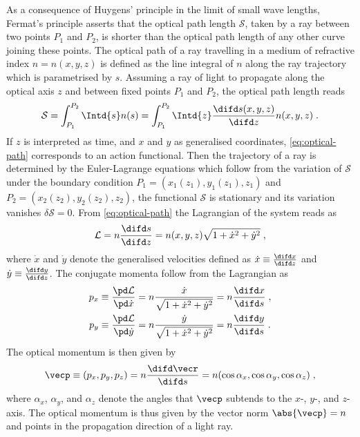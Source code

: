 \documentclass[
twoside,
openright,
titlepage,
numbers=noenddot,
headinclude,
fleqn,
a4paper,
footinclude=true,
cleardoublepage=empty,
abstractoff,
BCOR=5mm,
paper=a4,
fontsize=11pt,
british,ngerman,american,
]{scrreprt}
\begin{document}
As a consequence of Huygens' principle in the limit
of small wave lengths, Fermat's principle asserts that the optical
path length $\mathcal{S}$, taken by a ray between two points $P_1$ and
$P_2$, is shorter than the optical path length of any other curve
joining these points.  The optical path of a ray travelling in a
medium of refractive index $n=n(x,y,z)$ is defined as the line
integral of $n$ along the ray trajectory which is parametrised by $s$.
Assuming a ray of light to propagate along the optical axis $z$ and
between fixed points $P_1$ and $P_2$, the optical path length reads 
\begin{equation}
  \label{eq:optical-path}
  \mathcal{S} = \int_{P_1}^{P_2}\Intd{s}n(s) 
  = \int_{P_1}^{P_2}\Intd{z}\frac{\difd s(x,y,z)}{\difd z}n(x,y,z)\;.
\end{equation}
If $z$ is interpreted as time, and $x$ and $y$ as generalised
coordinates, \cref{eq:optical-path} corresponds to an action
functional.  Then the trajectory of a ray is determined by the
Euler-Lagrange equations which follow from the variation of
$\mathcal{S}$ under the boundary condition
$P_1=(x_1(z_1),y_1(z_1),z_1)$ and $P_2=(x_2(z_2),y_2(z_2),z_2)$, \ie{}
the functional $\mathcal{S}$ is stationary and its variation vanishes
$\delta\mathcal{S} = 0$.  From \cref{eq:optical-path} the Lagrangian
of the system reads as
\begin{equation}
  \label{eq:optical-path-lagrangian}
  \mathcal{L} = n\frac{\difd s}{\difd z} 
  = n(x,y,z)\sqrt{1+\dot{x}^2+\dot{y}^2}\;,
\end{equation}
where $\dot{x}$ and $\dot{y}$ denote the generalised velocities
defined as $\dot{x}\equiv\frac{\difd x}{\difd z}$ and
$\dot{y}\equiv\frac{\difd y}{\difd z}$.  The conjugate momenta follow
from the Lagrangian as
\begin{equation}
  \label{eq:conjugate-momentum}
  \begin{split}
    p_x & \equiv \frac{\pd \mathcal{L}}{\pd \dot{x} }
    = n\frac{\dot{x}}{\sqrt{1+\dot{x}^2+\dot{y}^2}} 
    = n \frac{\difd x}{\difd s} \;,
    \\p_y&\equiv\frac{\pd \mathcal{L}}{\pd \dot{y}}
    = n\frac{\dot{y}}{\sqrt{1+\dot{x}^2+\dot{y}^2}} 
    = n \frac{\difd y}{\difd s} \;.
  \end{split}
\end{equation}
The optical momentum is then given by
\begin{equation}
  \label{eq:optical-momentum}
  \vecp \equiv (p_x,p_y,p_z) 
  = n\frac{\difd\vecr}{\difd s}
  = n(\cos\alpha_x,\cos\alpha_y,\cos\alpha_z) \;,
\end{equation}
where $\alpha_x$, $\alpha_y$, and $\alpha_z$ denote the angles that
$\vecp$ subtends to the $x$-, $y$-, and $z$-axis.  The optical
momentum is thus given by the vector norm $\abs{\vecp}=n$ and points
in the propagation direction of a light ray.
\end{document}
